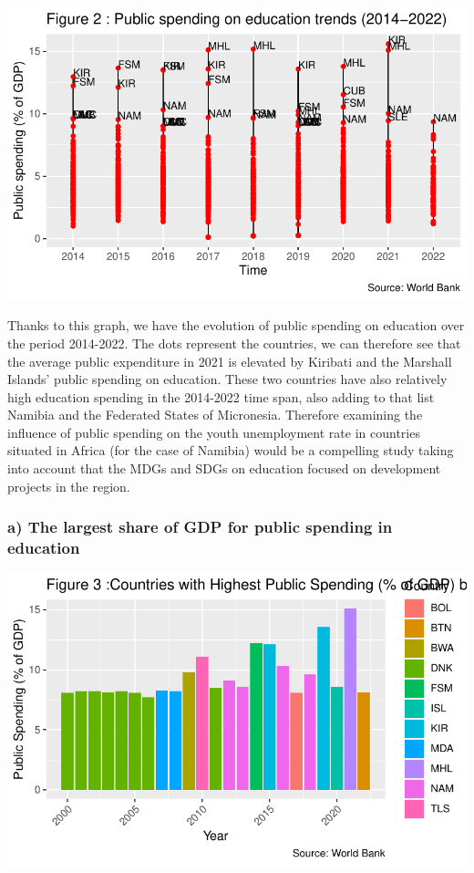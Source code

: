 \documentclass[
  letterpaper,
  DIV=11,
  numbers=noendperiod]{scrartcl}
\begin{document}
\includegraphics{Projet-BM_files/figure-pdf/unnamed-chunk-10-1.pdf}

Thanks to this graph, we have the evolution of public spending on
education over the period 2014-2022. The dots represent the countries,
we can therefore see that the average public expenditure in 2021 is
elevated by Kiribati and the Marshall Islands' public spending on
education. These two countries have also relatively high education
spending in the 2014-2022 time span, also adding to that list Namibia
and the Federated States of Micronesia. Therefore examining the
influence of public spending on the youth unemployment rate in countries
situated in Africa (for the case of Namibia) would be a compelling study
taking into account that the MDGs and SDGs on education focused on
development projects in the region.

\hypertarget{a-the-largest-share-of-gdp-for-public-spending-in-education}{%
\subsubsection{a) The largest share of GDP for public spending in
education}\label{a-the-largest-share-of-gdp-for-public-spending-in-education}}

\includegraphics{Projet-BM_files/figure-pdf/unnamed-chunk-11-1.pdf}
\end{document}
